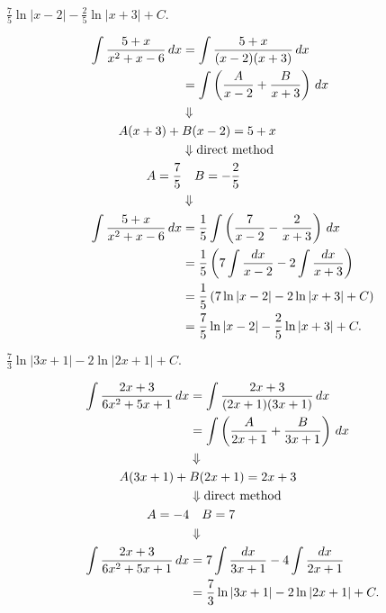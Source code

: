 

\newcommand{\dirm}{\deduce \text{direct method}}
\everymath{\displaystyle}


    {$ \frac{7}{5} \ln|x-2| - \frac{2}{5} \ln|x+3| + C. $}
    
    \begin{align*}
        \int \frac{5+x}{x^2 + x - 6} \, dx
            &= \int \frac{5+x}{(x-2)(x+3)} \, dx \\
            &= \int \left( \frac{A}{x-2} + \frac{B}{x+3} \right) \, dx \\
            &\deduce \\
        A(x+3) +{} &B(x-2) = 5+x \\
            &\dirm \\
        A = \frac{7}{5} &\quad B = -\frac{2}{5} \\
            &\deduce \\
        \int \frac{5+x}{x^2 + x - 6} \, dx
            &= \frac{1}{5} \int \paren{\frac{7}{x-2} - \frac{2}{x+3}}
                \, dx \\
            &= \frac{1}{5} \left( 7 \int \frac{dx}{x-2} - 2 \int
                \frac{dx}{x+3} \right) \\
            &= \frac{1}{5}\,(7\ln|x-2| - 2\ln|x+3| + C) \\
            &= \frac{7}{5} \ln|x-2| - \frac{2}{5} \ln|x+3| + C.
    \end{align*}
    
    {$ \frac{7}{3}\ln|3x+1| - 2\ln|2x+1| + C. $}
    
    \begin{align*}
        \int \frac{2x + 3}{6x^2 + 5x + 1} \, dx
            &= \int \frac{2x + 3}{(2x+1)(3x+1)} \, dx \\
            &= \int \paren{\frac{A}{2x+1} + \frac{B}{3x+1}} \, dx \\
            &\deduce \\
        A(3x+1) +{} &B(2x+1) = 2x+3 \\
            &\dirm \\
        A = -4 &\quad B = 7 \\
            &\deduce \\
        \int \frac{2x + 3}{6x^2 + 5x + 1} \, dx
            &= 7 \int \frac{dx}{3x+1} - 4 \int \frac{dx}{2x+1} \\
            &= \frac{7}{3}\ln|3x+1| - 2\ln|2x+1| + C.
    \end{align*}
    
